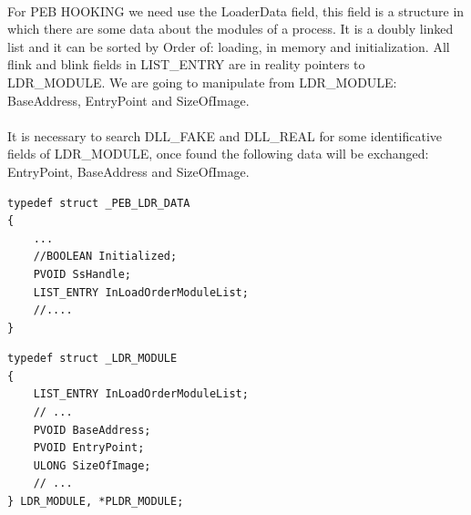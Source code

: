 \documentclass[12pt,a4paper,english]{book}
\newcommand{\keyword}[1]{\index{#1}#1}
\newcommand{\paraph}{\paragraph{}}
\begin{document}
\paraph{}
For PEB HOOKING we need use the LoaderData field, this field is a structure in which there are some data about the modules of a process. It is a doubly linked list and it can be sorted by Order of: loading, in memory and initialization. All flink and blink fields in LIST\_ENTRY are in reality pointers to LDR\_MODULE. We are going to manipulate from LDR\_MODULE: BaseAddress, EntryPoint and SizeOfImage.

\paraph{}
It is necessary to search DLL\_FAKE and DLL\_REAL for some identificative fields of LDR\_MODULE, once found the following data will be exchanged: EntryPoint, BaseAddress and SizeOfImage.

\lstset{language=C,caption=PEB Loader Data}
\begin{lstlisting}
typedef struct _PEB_LDR_DATA
{
    ...
    //BOOLEAN Initialized;
    PVOID SsHandle;
    LIST_ENTRY InLoadOrderModuleList;
    //....
}
\end{lstlisting}

\lstset{language=C,caption=Loader Module Data}
\begin{lstlisting}
typedef struct _LDR_MODULE
{
    LIST_ENTRY InLoadOrderModuleList;
    // ...
    PVOID BaseAddress;
    PVOID EntryPoint;
    ULONG SizeOfImage;
    // ...
} LDR_MODULE, *PLDR_MODULE;
\end{lstlisting}




\fancyhead[LE,RO]{}
\printbibliography[heading=bibintoc]

\clearpage
{}
\printindex
\end{document}
